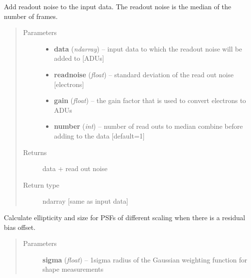 \documentclass[a4paper,11pt,english]{sphinxmanual}
\begin{document}
\begin{fulllineitems}
\label{reduction:analysis.biasCalibration.addReadoutNoise}
Add readout noise to the input data. The readout noise is the median of the number of frames.
\begin{quote}\begin{description}
\item[{Parameters}] \leavevmode\begin{itemize}
\item {} 
\textbf{data} (\emph{ndarray}) -- input data to which the readout noise will be added to {[}ADUs{]}

\item {} 
\textbf{readnoise} (\emph{float}) -- standard deviation of the read out noise {[}electrons{]}

\item {} 
\textbf{gain} (\emph{float}) -- the gain factor that is used to convert electrons to ADUs

\item {} 
\textbf{number} (\emph{int}) -- number of read outs to median combine before adding to the data {[}default=1{]}

\end{itemize}

\item[{Returns}] \leavevmode
data + read out noise

\item[{Return type}] \leavevmode
ndarray {[}same as input data{]}

\end{description}\end{quote}

\end{fulllineitems}


\begin{fulllineitems}
\label{reduction:analysis.biasCalibration.findTolerableErrorPiston}
Calculate ellipticity and size for PSFs of different scaling when there is a residual
bias offset.
\begin{quote}\begin{description}
\item[{Parameters}] \leavevmode
\textbf{sigma} (\emph{float}) -- 1sigma radius of the Gaussian weighting function for shape measurements

\end{description}\end{quote}

\end{fulllineitems}
\end{document}
